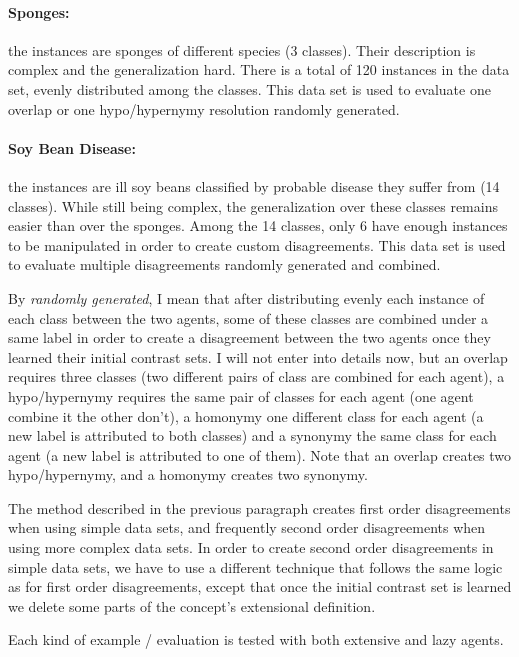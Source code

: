 \paragraph{Sponges:} the instances are sponges of different species (3 classes). Their description is complex and the generalization hard. There is a total of 120 instances in the data set, evenly distributed among the classes. This data set is used to evaluate one overlap or one hypo/hypernymy resolution randomly generated.

\paragraph{Soy Bean Disease:} the instances are ill soy beans classified by probable disease they suffer from (14 classes). While still being complex, the generalization over these classes remains easier than over the sponges. Among the 14 classes, only 6 have enough instances to be manipulated in order to create custom disagreements. This data set is used to evaluate multiple disagreements randomly generated and combined.

By \emph{randomly generated}, I mean that after distributing evenly each instance of each class between the two agents, some of these classes are combined under a same label in order to create a disagreement between the two agents once they learned their initial contrast sets. I will not enter into details now, but an overlap requires three classes (two different pairs of class are combined for each agent), a hypo/hypernymy requires the same pair of classes for each agent (one agent combine it the other don't), a homonymy one different class for each agent (a new label is attributed to both classes) and a synonymy the same class for each agent (a new label is attributed to one of them). Note that an overlap creates two hypo/hypernymy, and a homonymy creates two synonymy.

The method described in the previous paragraph creates first order disagreements when using simple data sets, and frequently second order disagreements when using more complex data sets. In order to create second order disagreements in simple data sets, we have to use a different technique that follows the same logic as for first order disagreements, except that once the initial contrast set is learned we delete some parts of the concept's extensional definition.

Each kind of example / evaluation is tested with both extensive and lazy agents.

